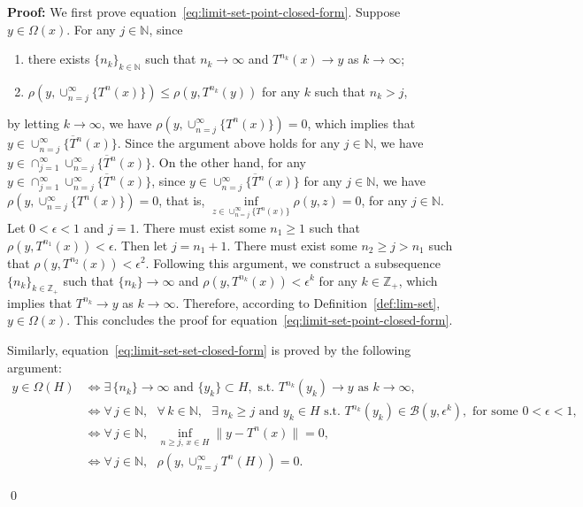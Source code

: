 \documentclass[10pt]{svmult}
\newcommand{\QED}{\begin{flushright}\qed \end{flushright}}
\begin{document}
\textbf{Proof:} We first prove equation~\eqref{eq:limit-set-point-closed-form}. Suppose $y\in \Omega(x)$. For any $j\in \mathbb{N}$, since 
\begin{enumerate}
\item there exists $\{n_k\}_{k\in \mathbb{N}}$ such that $n_k\to \infty$ and $T^{n_k}(x)\to y$ as $k\to \infty$;
\item $\rho(y,\cup_{n=j}^{\infty}\{T^n(x)\})\le \rho(y,T^{n_k}(y))$ for any $k$ such that $n_k>j$,
\end{enumerate}
by letting $k\to \infty$, we have $\rho(y,\cup_{n=j}^{\infty}\{T^n(x)\})=0$, which implies that $y\in \overline{\cup_{n=j}^{\infty}\{T^n(x)\}}$. Since the argument above holds for any $j\in \mathbb{N}$, we have $y\in \cap_{j=1}^{\infty}\overline{\cup_{n=j}^{\infty}\{T^n(x)\}}$. On the other hand, for any $y\in \cap_{j=1}^{\infty}\overline{\cup_{n=j}^{\infty}\{T^n(x)\}}$, since $y\in \overline{\cup_{n=j}^{\infty}\{T^n(x)\}}$ for any $j\in \mathbb{N}$, we have $\rho(y,\cup_{n=j}^{\infty}\{T^n(x)\})=0$, that is, $\inf\limits_{z\in \cup_{n=j}^{\infty}\{T^n(x)\}}\rho(y,z)=0$, for any $j\in \mathbb{N}$. Let $0<\epsilon<1$ and $j=1$. There must exist some $n_1\ge 1$ such that $\rho(y,T^{n_1}(x))<\epsilon$. Then let $j=n_1+1$. There must exist some $n_2\ge j>n_1$ such that $\rho(y,T^{n_2}(x))<\epsilon^2$. Following this argument, we construct a subsequence $\{n_k\}_{k\in \mathbb{Z}_+}$ such that $\{n_k\} \to \infty$ and $\rho(y,T^{n_k}(x))<\epsilon^k$ for any $k\in \mathbb{Z}_+$, which implies that $T^{n_k}\to y$ as $k\to \infty$. Therefore, according to Definition~\ref{def:lim-set}, $y\in \Omega(x)$. This concludes the proof for equation~\eqref{eq:limit-set-point-closed-form}.

Similarly, equation~\eqref{eq:limit-set-set-closed-form} is proved by the following argument:
\begin{align*}
y\in \Omega(H) & \iff \exists\, \{n_k\} \to \infty \text{ and }\{y_k\}\subset H,\text{ s.t. }T^{n_k}(y_k)\to y\text{ as }k\to \infty, \\
               & \iff \forall\, j\in \mathbb{N},\text{ }\forall\, k\in \mathbb{N},\text{ }\exists\, n_k\ge j\text{ and }y_k\in H\text{ s.t. }T^{n_k}(y_k)\in \mathcal{B}(y,\epsilon^k), \text{ for some }0<\epsilon<1,\\ 
               & \iff \forall\, j\in \mathbb{N}, \text{ }\inf_{n\ge j,\,x\in H} \lVert y-T^n(x) \rVert=0, \\
               & \iff \forall\, j\in \mathbb{N}, \text{ }\rho( y,\cup_{n=j}^{\infty} T^n(H) )=0.
\end{align*}\QED
\end{document}
